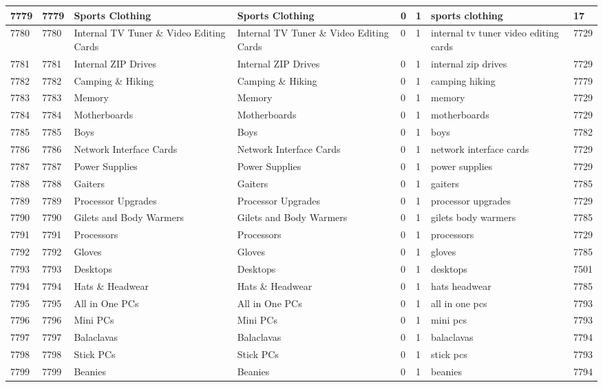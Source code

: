 \begin{longtable}{|l|l|l|l|l|l|l|l|}
7779 & 7779 & Sports Clothing & Sports Clothing & 0 & 1 & sports clothing & 17 \\ \hline 
7780 & 7780 & Internal TV Tuner \& Video Editing Cards & Internal TV Tuner \& Video Editing Cards & 0 & 1 & internal tv tuner video editing cards & 7729 \\ \hline 
7781 & 7781 & Internal ZIP Drives & Internal ZIP Drives & 0 & 1 & internal zip drives & 7729 \\ \hline 
7782 & 7782 & Camping \& Hiking & Camping \& Hiking & 0 & 1 & camping hiking & 7779 \\ \hline 
7783 & 7783 & Memory & Memory & 0 & 1 & memory & 7729 \\ \hline 
7784 & 7784 & Motherboards & Motherboards & 0 & 1 & motherboards & 7729 \\ \hline 
7785 & 7785 & Boys & Boys & 0 & 1 & boys & 7782 \\ \hline 
7786 & 7786 & Network Interface Cards & Network Interface Cards & 0 & 1 & network interface cards & 7729 \\ \hline 
7787 & 7787 & Power Supplies & Power Supplies & 0 & 1 & power supplies & 7729 \\ \hline 
7788 & 7788 & Gaiters & Gaiters & 0 & 1 & gaiters & 7785 \\ \hline 
7789 & 7789 & Processor Upgrades & Processor Upgrades & 0 & 1 & processor upgrades & 7729 \\ \hline 
7790 & 7790 & Gilets and Body Warmers & Gilets and Body Warmers & 0 & 1 & gilets body warmers & 7785 \\ \hline 
7791 & 7791 & Processors & Processors & 0 & 1 & processors & 7729 \\ \hline 
7792 & 7792 & Gloves & Gloves & 0 & 1 & gloves & 7785 \\ \hline 
7793 & 7793 & Desktops & Desktops & 0 & 1 & desktops & 7501 \\ \hline 
7794 & 7794 & Hats \& Headwear & Hats \& Headwear & 0 & 1 & hats headwear & 7785 \\ \hline 
7795 & 7795 & All in One PCs & All in One PCs & 0 & 1 & all in one pcs & 7793 \\ \hline 
7796 & 7796 & Mini PCs & Mini PCs & 0 & 1 & mini pcs & 7793 \\ \hline 
7797 & 7797 & Balaclavas & Balaclavas & 0 & 1 & balaclavas & 7794 \\ \hline 
7798 & 7798 & Stick PCs & Stick PCs & 0 & 1 & stick pcs & 7793 \\ \hline 
7799 & 7799 & Beanies & Beanies & 0 & 1 & beanies & 7794 \\ \hline 

\end{longtable}
